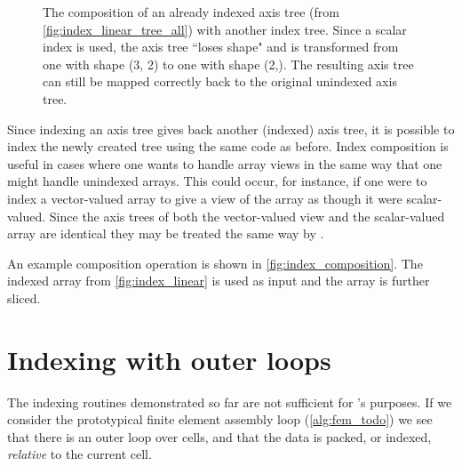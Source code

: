 \documentclass[thesis]{subfiles}
\begin{document}
\begin{figure}
  \caption{
    The composition of an already indexed axis tree (from \cref{fig:index_linear_tree_all}) with another index tree.
    Since a scalar index is used, the axis tree ``loses shape" and is transformed from one with shape (3, 2) to one with shape (2,).
    The resulting axis tree can still be mapped correctly back to the original unindexed axis tree.
  }
  \label{fig:index_composition_linear_tree_all}
\end{figure}

Since indexing an axis tree gives back another (indexed) axis tree, it is possible to index the newly created tree using the same code as before.
Index composition is useful in cases where one wants to handle array views in the same way that one might handle unindexed arrays.
This could occur, for instance, if one were to index a vector-valued array to give a view of the array as though it were scalar-valued.
Since the axis trees of both the vector-valued view and the scalar-valued array are identical they may be treated the same way by .

An example composition operation is shown in \cref{fig:index_composition}.
The indexed array from \cref{fig:index_linear} is used as input and the array is further sliced.



\section{Indexing with outer loops}
\label{sec:outer_loops}

The indexing routines demonstrated so far are not sufficient for 's purposes.
If we consider the prototypical finite element assembly loop (\cref{alg:fem_todo}) we see that there is an outer loop over cells, and that the data is packed, or indexed, \textit{relative} to the current cell.




\end{document}
